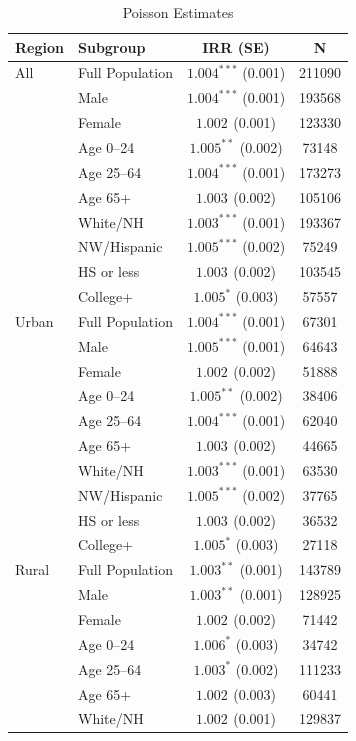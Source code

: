 \documentclass[12pt, a4paper]{article}
\begin{document}
\begin{table}[H]
\centering
\caption{Poisson Estimates}
\label{tab:poisson_reg_summary}
\begin{tabular}{llcc}
\toprule
\textbf{Region} & \textbf{Subgroup} & \textbf{IRR (SE)} & \textbf{N} \\
\midrule
All & Full Population & $1.004^{***}$ (0.001) & 211090 \\
 & Male & $1.004^{***}$ (0.001) & 193568 \\
 & Female & $1.002^{}$ (0.001) & 123330 \\
 & Age 0--24 & $1.005^{**}$ (0.002) & 73148 \\
 & Age 25--64 & $1.004^{***}$ (0.001) & 173273 \\
 & Age 65+ & $1.003^{}$ (0.002) & 105106 \\
 & White/NH & $1.003^{***}$ (0.001) & 193367 \\
 & NW/Hispanic & $1.005^{***}$ (0.002) & 75249 \\
 & HS or less & $1.003^{}$ (0.002) & 103545 \\
 & College+ & $1.005^{*}$ (0.003) & 57557 \\
 Urban & Full Population & $1.004^{***}$ (0.001) & 67301 \\
 & Male & $1.005^{***}$ (0.001) & 64643 \\
 & Female & $1.002^{}$ (0.002) & 51888 \\
 & Age 0--24 & $1.005^{**}$ (0.002) & 38406 \\
 & Age 25--64 & $1.004^{***}$ (0.001) & 62040 \\
 & Age 65+ & $1.003^{}$ (0.002) & 44665 \\
 & White/NH & $1.003^{***}$ (0.001) & 63530 \\
 & NW/Hispanic & $1.005^{***}$ (0.002) & 37765 \\
 & HS or less & $1.003^{}$ (0.002) & 36532 \\
 & College+ & $1.005^{*}$ (0.003) & 27118 \\
Rural & Full Population & $1.003^{**}$ (0.001) & 143789 \\
 & Male & $1.003^{**}$ (0.001) & 128925 \\
 & Female & $1.002^{}$ (0.002) & 71442 \\
 & Age 0--24 & $1.006^{*}$ (0.003) & 34742 \\
 & Age 25--64 & $1.003^{*}$ (0.002) & 111233 \\
 & Age 65+ & $1.002^{}$ (0.003) & 60441 \\
 & White/NH & $1.002^{}$ (0.001) & 129837 \\

\end{tabular}
\end{table}
\end{document}
